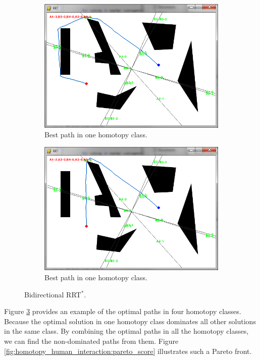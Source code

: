 \documentclass[letterpaper, 10 pt, conference]{ieeeconf}
\begin{document}
\begin{figure}
\begin{subfigure}[t]{0.47\linewidth}
		\centering
		\includegraphics[width=\textwidth]{fig/screenshot1/all_homotopy3.png}
		\caption{Best path in one homotopy class.}
		\label{fig:all_homotopy:03}
	\end{subfigure}  
	\begin{subfigure}[t]{0.47\linewidth}
		\centering
		\includegraphics[width=\textwidth]{fig/screenshot1/all_homotopy4.png}
		\caption{Best path in one homotopy class.}
		\label{fig:all_homotopy:all_scores}
	\end{subfigure}	   
	\caption{Bidirectional RRT$^{*}$.}
	\label{fig:all_homotopy:no_pref}
\end{figure}

Figure \ref{fig:all_homotopy:no_pref} provides an example of the optimal paths in four homotopy classes.
Because the optimal solution in one homotopy class dominates all other solutions in the same class.
By combining the optimal paths in all the homotopy classes, we can find the non-dominated paths from them.
Figure \ref{fig:homotopy_human_interaction:pareto_score} illustrates such a Pareto front.
\end{document}
